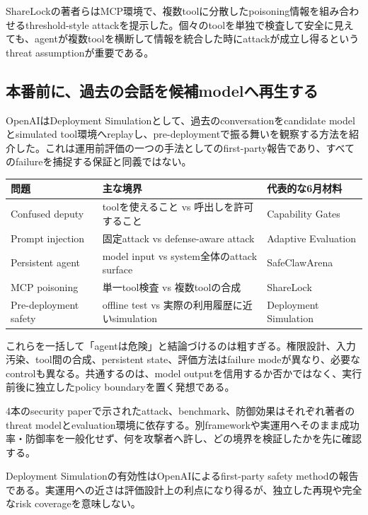 ShareLockの著者らはMCP環境で、複数toolに分散したpoisoning情報を組み合わせるthreshold-style attackを提示した。個々のtoolを単独で検査して安全に見えても、agentが複数toolを横断して情報を統合した時にattackが成立し得るというthreat assumptionが重要である。\autocite{src-91b06074799d}


\subsection{本番前に、過去の会話を候補modelへ再生する}

OpenAIはDeployment Simulationとして、過去のconversationをcandidate modelとsimulated tool環境へreplayし、pre-deploymentで振る舞いを観察する方法を紹介した。これは運用前評価の一つの手法としてのfirst-party報告であり、すべてのfailureを捕捉する保証と同義ではない。\autocite{src-c000018ba1f0}


\begin{center}
\small
\begin{tabularx}{\columnwidth}{>{\raggedright\arraybackslash}X|>{\raggedright\arraybackslash}X|>{\raggedright\arraybackslash}X}
\toprule
\textbf{問題} & \textbf{主な境界} & \textbf{代表的な6月材料} \\
\midrule
Confused deputy & toolを使えること vs 呼出しを許可すること & Capability Gates \\
Prompt injection & 固定attack vs defense-aware attack & Adaptive Evaluation \\
Persistent agent & model input vs system全体のattack surface & SafeClawArena \\
MCP poisoning & 単一tool検査 vs 複数toolの合成 & ShareLock \\
Pre-deployment safety & offline test vs 実際の利用履歴に近いsimulation & Deployment Simulation \\
\bottomrule
\end{tabularx}
\autocite{src-02da0db00c2d,src-6da0c5a88fa4,src-91b06074799d,src-c000018ba1f0,src-cd4b60edfee7}
\end{center}

これらを一括して「agentは危険」と結論づけるのは粗すぎる。権限設計、入力汚染、tool間の合成、persistent state、評価方法はfailure modeが異なり、必要なcontrolも異なる。共通するのは、model outputを信用するか否かではなく、実行前後に独立したpolicy boundaryを置く発想である。\autocite{src-02da0db00c2d,src-6da0c5a88fa4,src-91b06074799d,src-cd4b60edfee7}


\begin{claimboundary}
4本のsecurity paperで示されたattack、benchmark、防御効果はそれぞれ著者のthreat modelとevaluation環境に依存する。別frameworkや実運用へそのまま成功率・防御率を一般化せず、何を攻撃者へ許し、どの境界を検証したかを先に確認する。\autocite{src-02da0db00c2d,src-6da0c5a88fa4,src-91b06074799d,src-cd4b60edfee7}
\end{claimboundary}

\begin{claimboundary}
Deployment Simulationの有効性はOpenAIによるfirst-party safety methodの報告である。実運用への近さは評価設計上の利点になり得るが、独立した再現や完全なrisk coverageを意味しない。\autocite{src-c000018ba1f0}
\end{claimboundary}
